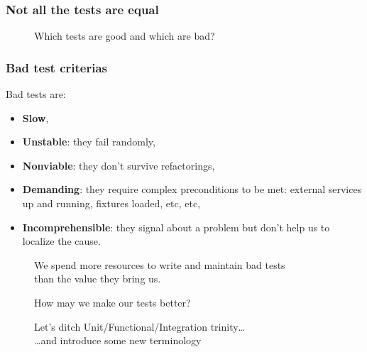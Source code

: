 \documentclass[usenames,dvipsnames,aspectratio=169]{beamer}
\begin{document}
\begin{frame}
  \frametitle{Not all the tests are equal}

  \begin{figure}
  \Huge Which tests are good and which are bad?
  \end{figure}
\end{frame}

\begin{frame}
  \frametitle{Bad test criterias}

  Bad tests are:
  \begin{itemize}
    \item \textbf{Slow},
    \item \textbf{Unstable}: they fail randomly,
    \item \textbf{Nonviable}: they don’t survive refactorings,
    \item \textbf{Demanding}: they require complex preconditions to be met: external services up and running, fixtures loaded, etc, etc,
    \item \textbf{Incomprehensible}: they signal about a problem but don’t help us to localize the cause.
  \end{itemize}
\end{frame}

\begin{frame}
  \begin{figure}
  \Huge We spend more resources to write and maintain bad tests \\
  than the value they bring us.
  \end{figure}
\end{frame}

\begin{frame}
  \begin{figure}
  \Huge How may we make our tests better?
  \end{figure}
\end{frame}

\begin{frame}
  \begin{figure}
  \Large Let's ditch Unit/Functional/Integration trinity\dots \\
  \Huge \dots and introduce some new terminology
  \end{figure}
\end{frame}
\end{document}
